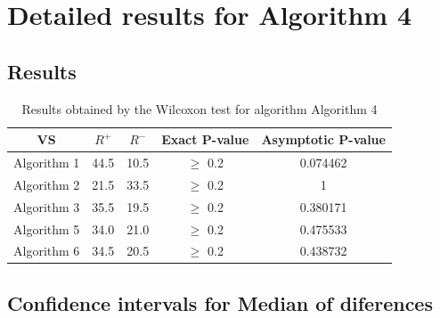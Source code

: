 \documentclass[a4paper,10pt]{article}
\begin{document}
 \clearpage 


\section{Detailed results for Algorithm 4}


\subsection{Results}

\begin{table}[!htp]
\centering\small
\begin{tabular}{
|c|c|c|c|c|}
\hline
 VS & $R^{+}$ & $R^{-}$ & Exact P-value & Asymptotic P-value \\ \hline 
Algorithm 1 & 44.5 & 10.5 & $\geq$ 0.2 & 0.074462\\ \hline 
Algorithm 2 & 21.5 & 33.5 & $\geq$ 0.2 & 1\\ \hline 
Algorithm 3 & 35.5 & 19.5 & $\geq$ 0.2 & 0.380171\\ \hline 
Algorithm 5 & 34.0 & 21.0 & $\geq$ 0.2 & 0.475533\\ \hline 
Algorithm 6 & 34.5 & 20.5 & $\geq$ 0.2 & 0.438732\\ \hline 

\end{tabular}
\caption{Results obtained by the Wilcoxon test for algorithm Algorithm 4}
\end{table}

\subsection{Confidence intervals for Median of diferences}
\end{document}
